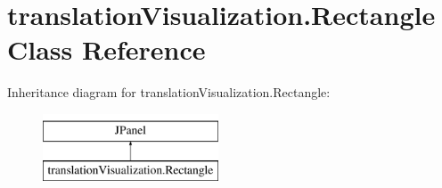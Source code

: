 \hypertarget{classtranslation_visualization_1_1_rectangle}{}\section{translation\+Visualization.\+Rectangle Class Reference}
\label{classtranslation_visualization_1_1_rectangle}
Inheritance diagram for translation\+Visualization.\+Rectangle\+:\begin{figure}[H]
\begin{center}
\leavevmode
\includegraphics[height=2.000000cm]{classtranslation_visualization_1_1_rectangle}
\end{center}
\end{figure}
